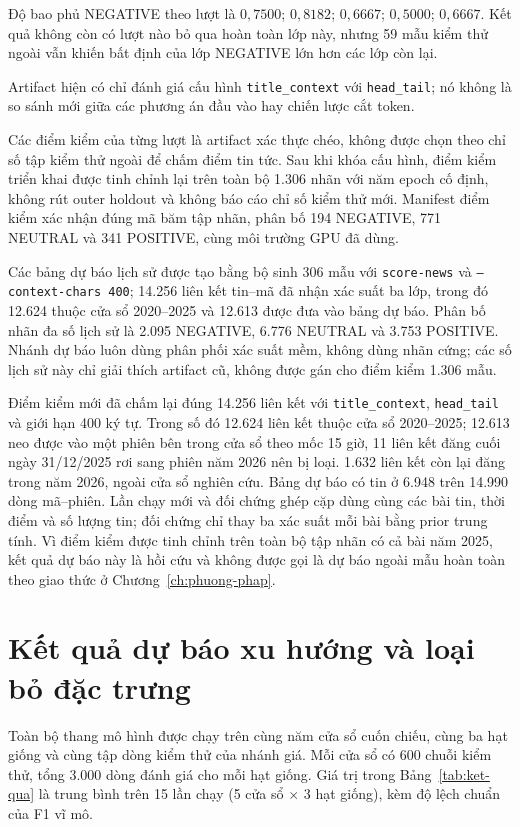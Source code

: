 Độ bao phủ NEGATIVE theo lượt là $0{,}7500$; $0{,}8182$; $0{,}6667$;
$0{,}5000$; $0{,}6667$. Kết quả không còn có lượt nào bỏ qua hoàn toàn lớp này,
nhưng 59 mẫu kiểm thử ngoài vẫn khiến bất định của lớp NEGATIVE lớn hơn các lớp còn lại.

Artifact hiện có chỉ đánh giá cấu hình \texttt{title\_context} với
\texttt{head\_tail}; nó không là so sánh mới giữa các phương án đầu vào hay chiến lược
cắt token.

Các điểm kiểm của từng lượt là artifact xác thực chéo, không được chọn theo chỉ số tập
kiểm thử ngoài để chấm điểm tin tức. Sau khi khóa cấu hình, điểm kiểm triển khai được
tinh chỉnh lại trên toàn bộ 1.306 nhãn với năm epoch cố định, không rút outer holdout và
không báo cáo chỉ số kiểm thử mới. Manifest điểm kiểm xác nhận đúng mã băm tập nhãn,
phân bố 194 NEGATIVE, 771 NEUTRAL và 341 POSITIVE, cùng môi trường GPU đã dùng.

Các bảng dự báo lịch sử được tạo bằng bộ sinh 306 mẫu với \texttt{score-news} và
\texttt{--context-chars 400}; 14.256 liên kết tin--mã đã nhận xác suất ba lớp, trong đó 12.624 thuộc cửa sổ 2020--2025 và 12.613 được đưa vào bảng dự báo. Phân bố
nhãn đa số lịch sử là 2.095 NEGATIVE, 6.776 NEUTRAL và 3.753 POSITIVE. Nhánh dự báo luôn
dùng phân phối xác suất mềm, không dùng nhãn cứng; các số lịch sử này chỉ giải thích
artifact cũ, không được gán cho điểm kiểm 1.306 mẫu.

Điểm kiểm mới đã chấm lại đúng 14.256 liên kết với \texttt{title\_context},
\texttt{head\_tail} và giới hạn 400 ký tự. Trong số đó 12.624 liên kết thuộc cửa sổ
2020--2025; 12.613 neo được vào một phiên bên trong cửa sổ theo mốc 15 giờ, 11 liên kết
đăng cuối ngày 31/12/2025 rơi sang phiên năm 2026 nên bị loại. 1.632 liên kết còn lại
đăng trong năm 2026, ngoài cửa sổ nghiên cứu. Bảng dự báo có tin ở
6.948 trên 14.990 dòng mã--phiên. Lần chạy mới và đối chứng ghép cặp dùng cùng các bài
tin, thời điểm và số
lượng tin; đối chứng chỉ thay ba xác suất mỗi bài bằng prior trung tính. Vì điểm kiểm được
tinh chỉnh trên toàn bộ tập nhãn có cả bài năm 2025, kết quả dự báo này là hồi cứu và không
được gọi là dự báo ngoài mẫu hoàn toàn theo giao thức ở Chương~\ref{ch:phuong-phap}.

\section{Kết quả dự báo xu hướng và loại bỏ đặc trưng}
\label{sec:kq-forecast}

Toàn bộ thang mô hình được chạy trên cùng năm cửa sổ cuốn chiếu, cùng ba hạt giống và
cùng tập dòng kiểm thử của nhánh giá. Mỗi cửa sổ có 600 chuỗi kiểm thử, tổng 3.000 dòng
đánh giá cho mỗi hạt giống. Giá trị trong Bảng~\ref{tab:ket-qua} là trung bình trên 15 lần
chạy (5 cửa sổ $\times$ 3 hạt giống), kèm độ lệch chuẩn của F1 vĩ mô.

